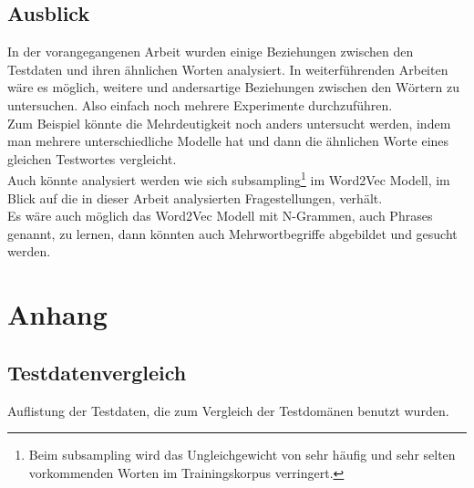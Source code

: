 \documentclass[12pt,a4paper]{report}
\begin{document}
\section{Ausblick}

In der vorangegangenen Arbeit wurden einige Beziehungen zwischen den Testdaten und ihren ähnlichen Worten analysiert. In weiterführenden Arbeiten wäre es möglich, weitere und andersartige Beziehungen zwischen den Wörtern zu untersuchen. Also einfach noch mehrere Experimente durchzuführen.\\
Zum Beispiel könnte die Mehrdeutigkeit noch anders untersucht werden, indem man mehrere unterschiedliche Modelle hat und dann die ähnlichen Worte eines gleichen Testwortes vergleicht.\\

Auch könnte analysiert werden wie sich subsampling\footnote{Beim subsampling wird das Ungleichgewicht von sehr häufig und sehr selten vorkommenden Worten im Trainingskorpus verringert\citep{DBLP:journals/corr/MikolovSCCD13}. } im Word2Vec Modell, im Blick auf die in dieser Arbeit analysierten Fragestellungen, verhält.\\
Es wäre auch möglich das Word2Vec Modell mit N-Grammen, auch Phrases genannt, zu lernen, dann könnten auch Mehrwortbegriffe abgebildet und gesucht werden.





\newpage


\nocite{DBLP:conf/naacl/MikolovYZ13}

\listoftables
\listoffigures 




\chapter{Anhang}
\section{Testdatenvergleich}
\label{Testdatenvergleich}
Auflistung der Testdaten, die zum Vergleich der Testdomänen benutzt wurden.\\
\end{document}

